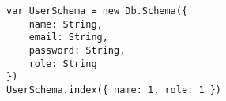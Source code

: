 

\lstset{language=C}

\begin{lstlisting}[frame=single]
var UserSchema = new Db.Schema({
	name: String,
	email: String,
	password: String,
	role: String
})
UserSchema.index({ name: 1, role: 1 })
\end{lstlisting}